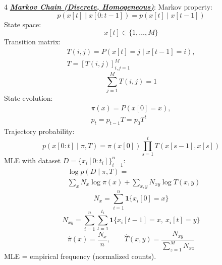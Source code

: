 \documentclass[12pt]{article}
\newcommand{\bulletPoint}[1]{\ul{\textit{\textbf{#1}}}}
\begin{document}
\begin{multicols*}{4}
\bulletPoint{Markov Chain (Discrete, Homogeneous)}:
Markov property:
\useshortskip \begin{equation*}
    p(x[t]\mid x[0:t-1])=p(x[t]\mid x[t-1])
\end{equation*}
State space:
\useshortskip \begin{equation*}
    x[t]\in\{1,\ldots,M\}
\end{equation*}
Transition matrix:
\useshortskip \begin{equation*}
    \begin{split}
    T(i,j)=P(x[t]=j\mid x[t-1]=i), \\
    T=[T(i,j)]_{i,j=1}^{M}
    \end{split}
\end{equation*}
\useshortskip \begin{equation*}
    \sum_{j=1}^{M}T(i,j)=1
\end{equation*}
State evolution:
\useshortskip \begin{equation*}
    \begin{split}
    \pi(x)=P(x[0]=x),\\
    p_t=p_{t-1}T=p_0T^t
    \end{split}
\end{equation*}
Trajectory probability:
\useshortskip \begin{equation*}
    p(x[0:t]\mid\pi,T)=
    \pi(x[0])\prod_{s=1}^{t}T(x[s-1],x[s])
\end{equation*}
MLE with dataset $D=\{x_i[0:t_i]\}_{i=1}^{n}$:
\useshortskip \begin{equation*}
    \begin{split}
    &\log p(D\mid\pi,T)= \\
    &\sum_x N_x\log \pi(x)+\sum_{x,y}N_{xy}\log T(x,y)
    \end{split}
\end{equation*}
\useshortskip \begin{equation*}
    N_x=\sum_{i=1}^{n}\mathbf{1}\{x_i[0]=x\}
\end{equation*}
\useshortskip \begin{equation*}
    N_{xy}=\sum_{i=1}^{n}\sum_{t=1}^{t_i}
    \mathbf{1}\{x_i[t-1]=x,\ x_i[t]=y\}
\end{equation*}
\useshortskip \begin{equation*}
    \hat{\pi}(x)=\frac{N_x}{n},\qquad
    \hat{T}(x,y)=\frac{N_{xy}}{\sum_{z=1}^{M}N_{xz}}
\end{equation*}
MLE = empirical frequency (normalized counts).


\end{multicols*}
\end{document}
